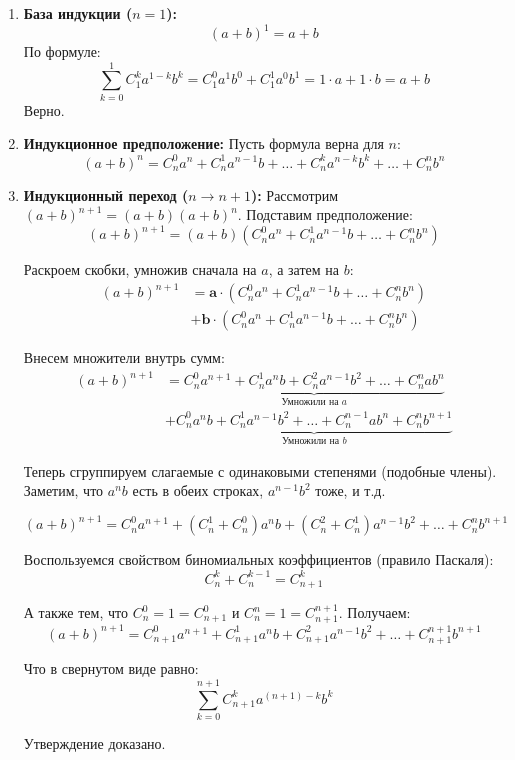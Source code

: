 \begin{tcolorbox}[title=Доказательство (ММИ)]
	\begin{enumerate}
		\item \textbf{База индукции ($n=1$):}
		$$ (a+b)^1 = a + b $$
		По формуле:
		$$ \sum_{k=0}^1 C_1^k a^{1-k}b^k = C_1^0 a^1 b^0 + C_1^1 a^0 b^1 = 1\cdot a + 1\cdot b = a+b $$
		Верно.
		
		\item \textbf{Индукционное предположение:}
		Пусть формула верна для $n$:
		$$ (a+b)^n = C_n^0 a^n + C_n^1 a^{n-1}b + \dots + C_n^k a^{n-k}b^k + \dots + C_n^n b^n $$
		
		\item \textbf{Индукционный переход ($n \to n+1$):}
		Рассмотрим $(a+b)^{n+1} = (a+b)(a+b)^n$. Подставим предположение:
		$$ (a+b)^{n+1} = (a+b) \left( C_n^0 a^n + C_n^1 a^{n-1}b + \dots + C_n^n b^n \right) $$
		
		Раскроем скобки, умножив сначала на $a$, а затем на $b$:
		\begin{align*}
			(a+b)^{n+1} &= \mathbf{a} \cdot (C_n^0 a^n + C_n^1 a^{n-1}b + \dots + C_n^n b^n) \\
			            &+ \mathbf{b} \cdot (C_n^0 a^n + C_n^1 a^{n-1}b + \dots + C_n^n b^n)
		\end{align*}
		
		Внесем множители внутрь сумм:
		\begin{align*}
			(a+b)^{n+1} &= \underbrace{C_n^0 a^{n+1} + C_n^1 a^n b + C_n^2 a^{n-1}b^2 + \dots + C_n^n ab^n}_{\text{Умножили на } a} \\
			            &+ \underbrace{C_n^0 a^n b + C_n^1 a^{n-1}b^2 + \dots + C_n^{n-1} ab^n + C_n^n b^{n+1}}_{\text{Умножили на } b}
		\end{align*}
		
		Теперь сгруппируем слагаемые с одинаковыми степенями (подобные члены).
		Заметим, что $a^n b$ есть в обеих строках, $a^{n-1}b^2$ тоже, и т.д.
		
		$$ (a+b)^{n+1} = C_n^0 a^{n+1} + (C_n^1 + C_n^0)a^n b + (C_n^2 + C_n^1)a^{n-1}b^2 + \dots + C_n^n b^{n+1} $$
		
		Воспользуемся свойством биномиальных коэффициентов (правило Паскаля):
		$$ C_n^k + C_n^{k-1} = C_{n+1}^k $$
		
		А также тем, что $C_n^0 = 1 = C_{n+1}^0$ и $C_n^n = 1 = C_{n+1}^{n+1}$.
		Получаем:
		$$ (a+b)^{n+1} = C_{n+1}^0 a^{n+1} + C_{n+1}^1 a^n b + C_{n+1}^2 a^{n-1}b^2 + \dots + C_{n+1}^{n+1} b^{n+1} $$
		
		Что в свернутом виде равно:
		$$ \sum_{k=0}^{n+1} C_{n+1}^k a^{(n+1)-k}b^k $$
		
		Утверждение доказано.
	\end{enumerate}
\end{tcolorbox}


